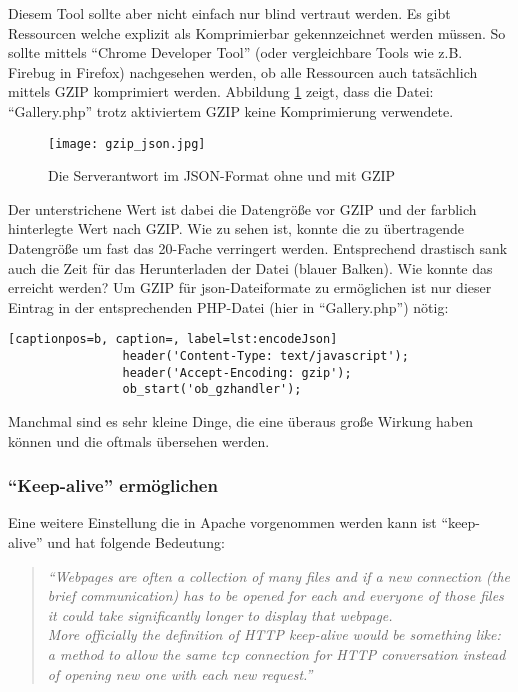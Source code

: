 				Diesem Tool sollte aber nicht einfach nur blind vertraut werden. Es gibt Ressourcen welche explizit als Komprimierbar gekennzeichnet werden müssen. So sollte mittels "`Chrome Developer Tool"' (oder vergleichbare Tools wie z.B. Firebug in Firefox) nachgesehen werden, ob alle Ressourcen auch tatsächlich mittels GZIP komprimiert werden. Abbildung \ref{fig:gzip_json} zeigt, dass die Datei: "`Gallery.php"' trotz aktiviertem GZIP keine Komprimierung verwendete.

				\begin{figure}[htbp]
					\begin{center}
						\texttt{[image: gzip\_json.jpg]}
						\caption{Die Serverantwort im JSON-Format ohne und mit GZIP}
						\label{fig:gzip_json}
					\end{center}
				\end{figure}

				Der unterstrichene Wert ist dabei die Datengröße vor GZIP und der farblich hinterlegte Wert nach GZIP. Wie zu sehen ist, konnte die zu übertragende Datengröße um fast das 20-Fache verringert werden. Entsprechend drastisch sank auch die Zeit für das Herunterladen der Datei (blauer Balken). Wie konnte das erreicht werden? Um GZIP für json-Dateiformate zu ermöglichen ist nur dieser Eintrag in der entsprechenden PHP-Datei (hier in "`Gallery.php"') nötig:

				\begin{lstlisting}[captionpos=b, caption=, label=lst:encodeJson]
				header('Content-Type: text/javascript');
				header('Accept-Encoding: gzip');
				ob_start('ob_gzhandler');
				\end{lstlisting}

				Manchmal sind es sehr kleine Dinge, die eine überaus große Wirkung haben können und die oftmals übersehen werden.
				
			\pagebreak



			\subsubsection{"`Keep-alive"' ermöglichen} %
			\label{ssub:keep_alive_ermöglichen}
				Eine weitere Einstellung die in Apache vorgenommen werden kann ist "`keep-alive"' und hat folgende Bedeutung:
				\begin{quote}
					\textit{"`Webpages are often a collection of many files and if a new connection (the brief communication) has to be opened for each and everyone of those files it could take significantly longer to display that webpage.\\
					More officially the definition of HTTP keep-alive would be something like: a method to allow the same tcp connection for HTTP conversation instead of opening new one with each new request."'}\autocite{sextonAlive}
				\end{quote}


